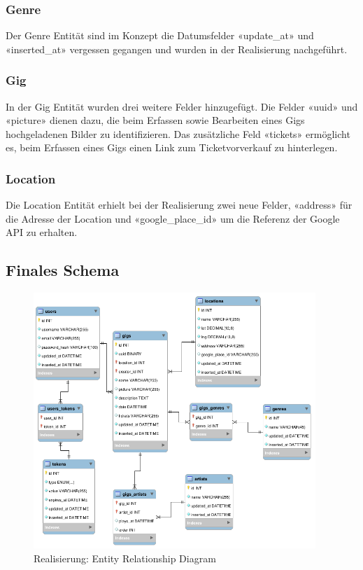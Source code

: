 \subsubsection{Genre}
Der Genre Entität sind im Konzept die Datumsfelder «update\_at» und «inserted\_at»
vergessen gegangen und wurden in der Realisierung nachgeführt.

\subsubsection{Gig}\label{RealisierungSchemaGig}
In der Gig Entität wurden drei weitere Felder hinzugefügt.
Die Felder «uuid» und «picture» dienen dazu, die beim Erfassen sowie
Bearbeiten eines Gigs hochgeladenen Bilder zu identifizieren.
Das zusätzliche Feld «tickets» ermöglicht es, beim Erfassen eines Gigs
einen Link zum Ticketvorverkauf zu hinterlegen.

\subsubsection{Location}
Die Location Entität erhielt bei der Realisierung zwei neue Felder,
«address» für die Adresse der Location und
«google\_place\_id» um die Referenz der Google API zu erhalten.

\clearpage
\subsection{Finales Schema}

\begin{figure}[!htb]
  \centering
  \includegraphics[width=0.95\textwidth]{realisierung/erd.png}
  \caption{Realisierung: Entity Relationship Diagram}
\end{figure}

